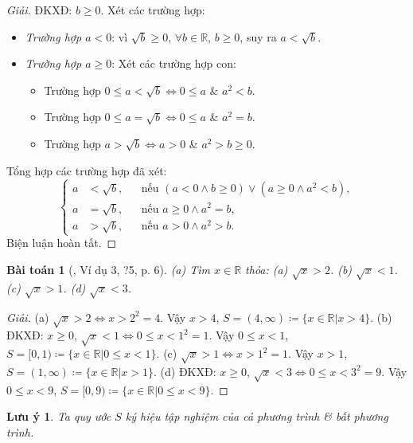 \documentclass{article}
\newtheorem{baitoan}{Bài toán}
\newtheorem{luuy}{Lưu ý}
\begin{document}
\begin{proof}[Giải]
	ĐKXĐ: $b\ge0$. Xét các trường hợp:
	\begin{itemize}
		\item \textit{Trường hợp $a < 0$}: vì $\sqrt{b}\ge0$, $\forall b\in\mathbb{R}$, $b\ge0$, suy ra $a < \sqrt{b}$.
		\item \textit{Trường hợp $a\ge0$}: Xét các trường hợp con:
		\begin{itemize}
			\item Trường hợp $0\le a < \sqrt{b}\Leftrightarrow0\le a$ \& $a^2 < b$.
			\item Trường hợp $0\le a = \sqrt{b}\Leftrightarrow0\le a$ \& $a^2 = b$.
			\item Trường hợp $a > \sqrt{b}\Leftrightarrow a > 0$ \& $a^2 > b\ge0$.
		\end{itemize}
	\end{itemize}
	Tổng hợp các trường hợp đã xét:
	\begin{equation*}
		\left\{\begin{split}
			a &< \sqrt{b},&&\mbox{nếu } (a < 0\land b\ge0)\lor(a\ge0\land a^2 < b),\\
			a &= \sqrt{b},&&\mbox{nếu } a\ge0\land a^2 = b,\\
			a &> \sqrt{b},&&\mbox{nếu } a > 0\land a^2 > b.
		\end{split}\right.
	\end{equation*}
	Biện luận hoàn tất.
\end{proof}

\begin{baitoan}[\cite{SGK_Toan_9_tap_1}, Ví dụ 3, ?5, p. 6]
	(a) Tìm $x\in\mathbb{R}$ thỏa: (a) $\sqrt{x} > 2$. (b) $\sqrt{x} < 1$. (c) $\sqrt{x} > 1$. (d) $\sqrt{x} < 3$.
\end{baitoan}

\begin{proof}[Giải]
	(a) $\sqrt{x} > 2\Leftrightarrow x > 2^2 = 4$. Vậy $x > 4$, $S = (4,\infty)\coloneqq\{x\in\mathbb{R}|x > 4\}$. (b) ĐKXĐ: $x\ge0$, $\sqrt{x} < 1\Leftrightarrow0\le x < 1^2 = 1$. Vậy $0\le x < 1$, $S = [0,1)\coloneqq\{x\in\mathbb{R}|0\le x < 1\}$. (c) $\sqrt{x} > 1\Leftrightarrow x > 1^2 = 1$. Vậy $x > 1$, $S = (1,\infty)\coloneqq\{x\in\mathbb{R}|x > 1\}$. (d) ĐKXĐ: $x\ge0$, $\sqrt{x} < 3\Leftrightarrow0\le x < 3^2 = 9$. Vậy $0\le x < 9$, $S = [0,9)\coloneqq\{x\in\mathbb{R}|0\le x < 9\}$.
\end{proof}

\begin{luuy}
	Ta quy ước $S$ ký hiệu {\rm tập nghiệm} của cả phương trình \& bất phương trình.
\end{luuy}
\end{document}
